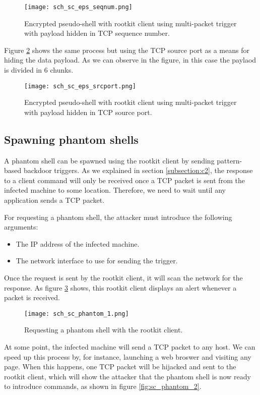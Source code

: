 \begin{figure}[htbp]
	\centering
	\texttt{[image: sch\_sc\_eps\_seqnum.png]}
	\caption{Encrypted pseudo-shell with rootkit client using multi-packet trigger with payload hidden in TCP sequence number.}
	\label{fig:sc_eps_seqnum}
\end{figure}

Figure \ref{fig:sc_eps_srcport} shows the same process but using the TCP source port as a means for hiding the data payload. As we can observe in the figure, in this case the paylaod is divided in 6 chunks.

\begin{figure}[htbp]
	\centering
	\texttt{[image: sch\_sc\_eps\_srcport.png]}
	\caption{Encrypted pseudo-shell with rootkit client using multi-packet trigger with payload hidden in TCP source port.}
	\label{fig:sc_eps_srcport}
\end{figure}

\subsection{Spawning phantom shells}
A phantom shell can be spawned using the rootkit client by sending pattern-based backdoor triggers. As we explained in section \ref{subsection:c2}, the response to a client command will only be received once a TCP packet is sent from the infected machine to some location. Therefore, we need to wait until any application sends a TCP packet.

For requesting a phantom shell, the attacker must introduce the following arguments:
\begin{itemize}
\item The IP address of the infected machine.
\item The network interface to use for sending the trigger.
\end{itemize}

Once the request is sent by the rootkit client, it will scan the network for the response. As figure \ref{fig:sc_phantom_1} shows, this rootkit client displays an alert whenever a packet is received.

\begin{figure}[htbp]
	\centering
	\texttt{[image: sch\_sc\_phantom\_1.png]}
	\caption{Requesting a phantom shell with the rootkit client.}
	\label{fig:sc_phantom_1}
\end{figure}

At some point, the infected machine will send a TCP packet to any host. We can speed up this process by, for instance, launching a web broswer and visiting any page. When this happens, one TCP packet will be hijacked and sent to the rootkit client, which will show the attacker that the phantom shell is now ready to introduce commands, as shown in figure \ref{fig:sc_phantom_2}.

